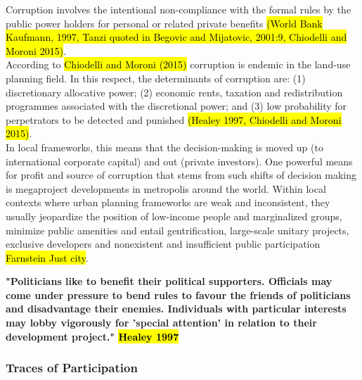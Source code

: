 \documentclass[11pt]{report}
\begin{document}
Corruption involves the intentional  non-compliance  with  the  formal  rules by the public power holders for personal or related private benefits \hl{(World Bank Kaufmann,  1997, Tanzi quoted in Begovic and Mijatovic,  2001:9, Chiodelli and Moroni 2015)}.
\\
According to \hl{Chiodelli and Moroni (2015)}
corruption is endemic in the land-use planning field.
In this respect, the determinants of corruption are:
(1) discretionary allocative power; (2) economic rents, taxation and redistribution programmes associated with the discretional power; and (3) low probability for perpetrators to be detected and punished \hl{(Healey 1997, Chiodelli and Moroni 2015)}.
\\
In local frameworks, this means that the decision-making is moved up (to international corporate capital) and out (private investors).
One powerful means for profit and source of corruption that stems from such shifts of decision making is megaproject developments in metropolis around the world.
Within local contexts where urban planning frameworks are weak and inconsistent, they usually jeopardize the position of low-income people and marginalized groups, minimize public amenities and entail gentrification, large-scale unitary projects, exclusive developers and nonexistent and insufficient public participation \hl{Farnstein Just city}.

\textbf{"Politicians like to benefit their political supporters. Officials may come under pressure to bend rules to favour the friends of politicians and disadvantage their enemies. Individuals with particular interests may lobby vigorously for 'special attention' in relation to their development project." \hl{Healey 1997}}

\subsubsection{Traces of Participation}
\end{document}
